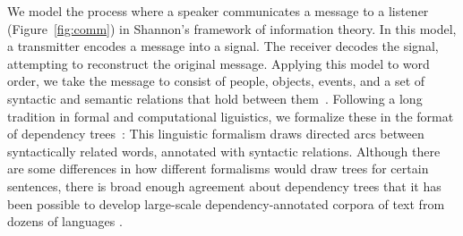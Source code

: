 \documentclass[9pt,twocolumn,twoside,lineno]{pnas-new}
\newcommand{\key}[1]{\textbf{#1}}
\begin{document}


%
%


We model the process where a speaker communicates a message to a listener (Figure~\ref{fig:comm}) in Shannon's framework of information theory.
In this model, a transmitter encodes a message into a signal. The receiver decodes the signal, attempting to reconstruct the original message.
Applying this model to word order, we take the message to consist of people, objects, events, and a set of syntactic and semantic relations that hold between them~\cite{fodor1975language,jackendoff1983semantics,pinker1990natural}.
Following a long tradition in formal and computational liguistics, we formalize these in the format of dependency trees~\cite{hays1964dependency,melcuk1988dependency,corbett1993heads,tesniere2015elements}:
This linguistic formalism draws directed arcs between syntactically related words, annotated with syntactic relations.
Although there are some differences in how different formalisms would draw trees for certain sentences, there is broad enough agreement about dependency trees that it has been possible to develop large-scale dependency-annotated corpora of text from dozens of languages \cite{nivre2017universal}.



\end{document}
